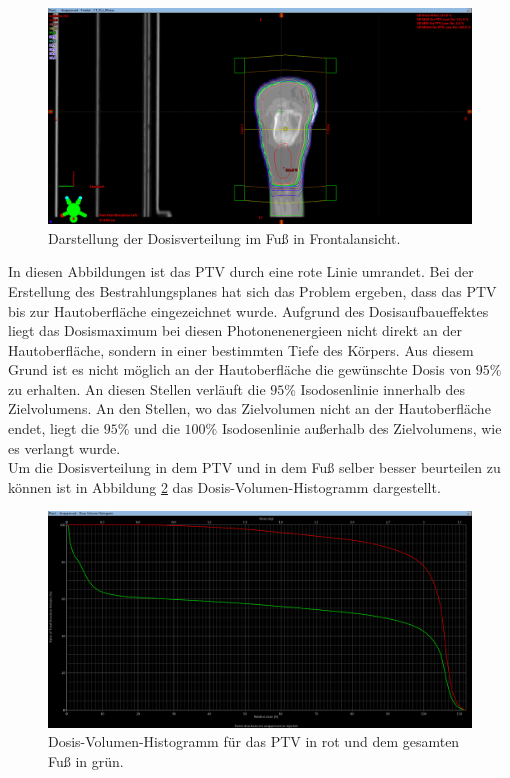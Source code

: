 \begin{figure}[H]
  \centering
  \includegraphics[width=\textwidth]{Bilder/XAnsicht.png}
  \caption{Darstellung der Dosisverteilung im Fuß in Frontalansicht.}
  \label{abb:x}
\end{figure}

In diesen Abbildungen ist das PTV durch eine rote Linie umrandet.
Bei der Erstellung des Bestrahlungsplanes hat sich das Problem ergeben, dass das PTV
bis zur Hautoberfläche eingezeichnet wurde.
Aufgrund des Dosisaufbaueffektes liegt das Dosismaximum bei diesen Photonenenergieen
nicht direkt an der Hautoberfläche, sondern in einer bestimmten Tiefe des Körpers.
Aus diesem Grund ist es nicht möglich an der Hautoberfläche die gewünschte Dosis von
$95\%$ zu erhalten. An diesen Stellen verläuft die $95\%$ Isodosenlinie innerhalb des
Zielvolumens. An den Stellen, wo das Zielvolumen nicht an der Hautoberfläche endet,
liegt die $95\%$ und die $100\%$ Isodosenlinie außerhalb des Zielvolumens, wie es verlangt wurde. \\

Um die Dosisverteilung in dem PTV und in dem Fuß selber besser beurteilen zu können
ist in Abbildung \ref{abb:DVH} das Dosis-Volumen-Histogramm dargestellt.

\begin{figure}[H]
  \centering
  \includegraphics[width=\textwidth]{Bilder/DVH.png}
  \caption{Dosis-Volumen-Histogramm für das PTV in rot und dem gesamten Fuß in grün.}
  \label{abb:DVH}
\end{figure}

